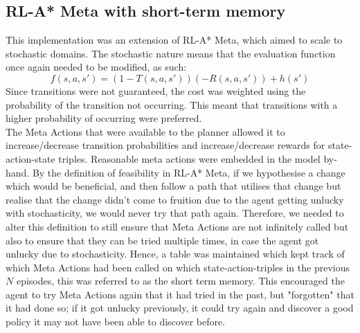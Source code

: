 \subsection{RL-A* Meta with short-term memory}
This implementation was an extension of RL-A* Meta, which aimed to scale to stochastic domains. The stochastic nature means that the evaluation function once again needed to be modified, as such:
\begin{equation}
\label{eqn:astarevalsast}
f(s, a, s') = (1-T(s, a, s'))(-R(s,a, s')) + h(s')
\end{equation}
Since transitions were not guaranteed, the cost was weighted using the probability of the transition not occurring. This meant that transitions with a higher probability of occurring were preferred.
\\ The Meta Actions that were available to the planner allowed it to increase/decrease transition probabilities and increase/decrease rewards for state-action-state triples. Reasonable meta actions were embedded in the model by-hand. 
By the definition of feasibility in RL-A* Meta, if we hypothesise a change which would be beneficial, and then follow a path that utilises that change but realise that the change didn't come to fruition due to the agent getting unlucky with stochasticity, we would never try that path again. Therefore, we needed to alter this definition to still ensure that Meta Actions are not infinitely called but also to ensure that they can be tried multiple times, in case the agent got unlucky due to stochasticity. Hence, a table was maintained which kept track of which Meta Actions had been called on which state-action-triples in the previous $N$ episodes, this was referred to as the short term memory. This encouraged the agent to try Meta Actions again that it had tried in the past, but "forgotten" that it had done so; if it got unlucky previously, it could try again and discover a good policy it may not have been able to discover before.
